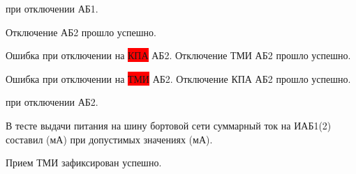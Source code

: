 			 при отключении АБ1.
			
	
	
			Отключение АБ2 прошло успешно.
		
			Ошибка при отключении на \colorbox{red}{КПА} АБ2. Отключение ТМИ АБ2 прошло успешно.
		
			Ошибка при отключении на \colorbox{red}{ТМИ} АБ2. Отключение КПА АБ2 прошло успешно.
		
			 при отключении АБ2.
		
	
	В тесте выдачи питания на шину бортовой  сети суммарный ток на ИАБ1(2) составил  (мА) при допустимых значениях  (мА).
	
	Прием ТМИ зафиксирован
	успешно.
	
		 
